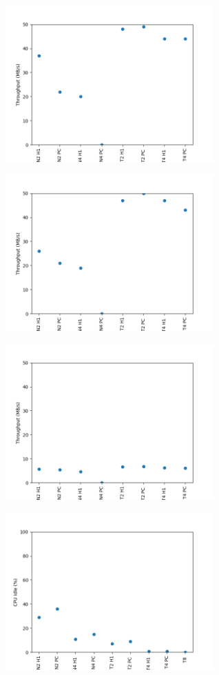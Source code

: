 \documentclass[twocolumn,10pt]{asme2e}
\begin{document}
\begin{figure}[h!]
        \includegraphics[width=13cm,height=6cm]{LINR_64_THR.png}
\end{figure}

\begin{figure}[h!]
        \includegraphics[width=13cm,height=6cm]{LOGR_64_THR.png}
\end{figure}

\begin{figure}[h!]
        \includegraphics[width=13cm,height=6cm]{CC_64_THR.png}
\end{figure}

\begin{figure}[h!]
        \includegraphics[width=13cm,height=6cm]{PR_64_IDLE.png}
\end{figure}
\end{document}
